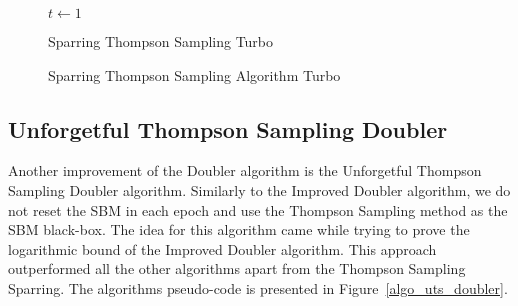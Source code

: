 \documentclass{llncs}
\begin{document}
	\begin{figure}[h]
	\IncMargin{1em}
		\begin{algorithm}[H]
		
		\BlankLine
		$t\leftarrow 1$\\
			\caption{Sparring Thompson Sampling Turbo}
		\end{algorithm}
		\caption{Sparring Thompson Sampling Algorithm Turbo}\label{alg:SparringTS_turbo}
	\end{figure}
					
	\subsection{Unforgetful Thompson Sampling Doubler}
		Another improvement of the Doubler algorithm is the Unforgetful Thompson Sampling Doubler algorithm. Similarly to the Improved Doubler algorithm, we do not reset the SBM in each epoch and use the Thompson Sampling method as the SBM black-box. 
		The idea for this algorithm came while trying to prove the logarithmic bound of the Improved Doubler algorithm.	
		This approach outperformed all the other algorithms apart from the Thompson Sampling Sparring.
		The algorithms pseudo-code is presented in Figure~\ref{algo_uts_doubler}.
\end{document}
